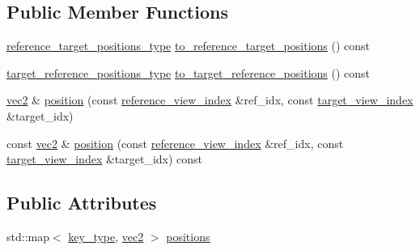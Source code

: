 \subsection*{Public Member Functions}
\begin{DoxyCompactItemize}
\item 
\hyperlink{structtlz_1_1relative__camera__positions_add616a43c418d61c9945d71ac7d403de}{reference\+\_\+target\+\_\+positions\+\_\+type} \hyperlink{structtlz_1_1relative__camera__positions_a210689e9345a5fea8e61f026db619c8b}{to\+\_\+reference\+\_\+target\+\_\+positions} () const 
\item 
\hyperlink{structtlz_1_1relative__camera__positions_a22e8f4b822109a48c870edb85d37a24b}{target\+\_\+reference\+\_\+positions\+\_\+type} \hyperlink{structtlz_1_1relative__camera__positions_abc210fc9594b475dcbbb8706e0122742}{to\+\_\+target\+\_\+reference\+\_\+positions} () const 
\item 
\hyperlink{namespacetlz_ae192989bfbe6c700ac84d2a8cf05ebb4}{vec2} \& \hyperlink{structtlz_1_1relative__camera__positions_a6680a08e1b0fed188e74280cb4874db0}{position} (const \hyperlink{structtlz_1_1relative__camera__positions_ae555c11fb699f3f9259a580f7e993020}{reference\+\_\+view\+\_\+index} \&ref\+\_\+idx, const \hyperlink{structtlz_1_1relative__camera__positions_a8af150a7c8a06957851bd43e08aa4891}{target\+\_\+view\+\_\+index} \&target\+\_\+idx)
\item 
const \hyperlink{namespacetlz_ae192989bfbe6c700ac84d2a8cf05ebb4}{vec2} \& \hyperlink{structtlz_1_1relative__camera__positions_ad28a823f9de71b5b7924bbe68741dfab}{position} (const \hyperlink{structtlz_1_1relative__camera__positions_ae555c11fb699f3f9259a580f7e993020}{reference\+\_\+view\+\_\+index} \&ref\+\_\+idx, const \hyperlink{structtlz_1_1relative__camera__positions_a8af150a7c8a06957851bd43e08aa4891}{target\+\_\+view\+\_\+index} \&target\+\_\+idx) const 
\end{DoxyCompactItemize}
\subsection*{Public Attributes}
\begin{DoxyCompactItemize}
\item 
std\+::map$<$ \hyperlink{structtlz_1_1relative__camera__positions_a131cad34840b596589a44dfdc079ff6c}{key\+\_\+type}, \hyperlink{namespacetlz_ae192989bfbe6c700ac84d2a8cf05ebb4}{vec2} $>$ \hyperlink{structtlz_1_1relative__camera__positions_ab580107ab7895b831d9fac57bd84c324}{positions}
\end{DoxyCompactItemize}


